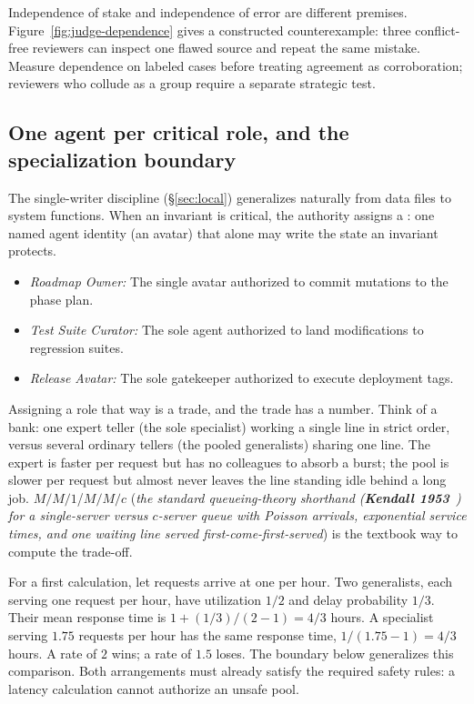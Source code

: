 \documentclass[11pt,a4paper]{article}
\theoremstyle{definition}
\theoremstyle{plain}
\begin{document}
Independence of stake and independence of error are different premises.
Figure~\ref{fig:judge-dependence} gives a constructed counterexample: three
conflict-free reviewers can inspect one flawed source and repeat the same
mistake. Measure dependence on labeled cases before treating agreement as
corroboration; reviewers who collude as a group require a separate strategic
test.


\subsection{One agent per critical role, and the specialization boundary}\label{sec:sole-roles}

The single-writer discipline (\S\ref{sec:local}) generalizes naturally from data files to system functions. When an invariant is critical, the authority assigns a : one named agent identity (an avatar) that alone may write the state an invariant protects.
\begin{itemize}[leftmargin=1.4em,itemsep=1pt]
\item \emph{Roadmap Owner:} The single avatar authorized to commit mutations to the phase plan.
\item \emph{Test Suite Curator:} The sole agent authorized to land modifications to regression suites.
\item \emph{Release Avatar:} The sole gatekeeper authorized to execute deployment tags.
\end{itemize}

Assigning a role that way is a trade, and the trade has a number. Think of a bank:
one expert teller (the sole specialist) working a single line in strict order,
versus several ordinary tellers (the pooled generalists) sharing one line. The
expert is faster per request but has no colleagues to absorb a burst; the pool is
slower per request but almost never leaves the line standing idle behind a long
job. \textbf{$M/M/1$}/\textbf{$M/M/c$} (\emph{the standard queueing-theory
shorthand (\textbf{Kendall 1953}~) for a single-server versus
$c$-server queue with Poisson arrivals, exponential service times, and one waiting
line served first-come-first-served}) is the textbook way to compute the trade-off.

For a first calculation, let requests arrive at one per hour. Two generalists, each serving one request per hour, have utilization $1/2$ and delay probability $1/3$. Their mean response time is $1+(1/3)/(2-1)=4/3$ hours. A specialist serving $1.75$ requests per hour has the same response time, $1/(1.75-1)=4/3$ hours. A rate of $2$ wins; a rate of $1.5$ loses. The boundary below generalizes this comparison. Both arrangements must already satisfy the required safety rules: a latency calculation cannot authorize an unsafe pool.
\end{document}

